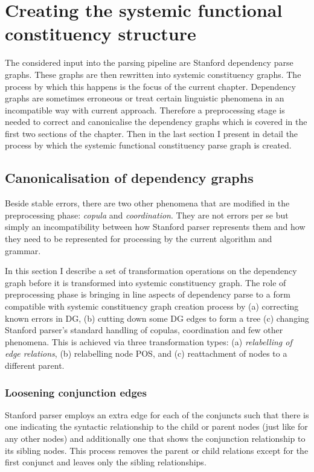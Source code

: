 \chapter{Creating the systemic functional constituency structure}
\label{ch:parsing-algorithm}

The considered input into the parsing pipeline are Stanford dependency parse graphs. These graphs are then rewritten into systemic constituency graphs. The process by which this happens is the focus of the current chapter. Dependency graphs are sometimes erroneous or treat certain linguistic phenomena in an incompatible way with current approach. Therefore a preprocessing stage is needed to correct and canonicalise the dependency graphs which is covered in the first two sections of the chapter. Then in the last section I present in detail the process by which the systemic functional constituency parse graph is created. 

\section{Canonicalisation of dependency graphs}
\label{sec:preprocessing1}
Beside stable errors, there are two other phenomena that are modified in the preprocessing phase: \textit{copula} and \textit{coordination}. They are not errors per se but simply an incompatibility between how Stanford parser represents them and how they need to be represented for processing by the current algorithm and grammar.

In this section I describe a set of transformation operations on the dependency graph before it is transformed into systemic constituency graph. The role of preprocessing phase is bringing in line aspects of dependency parse to a form compatible with systemic constituency graph creation process by (a) correcting known errors in DG, (b) cutting down some DG edges to form a tree (c) changing Stanford parser's standard handling of copulas, coordination and few other phenomena. This is achieved via three transformation types: (a) \textit{relabelling of edge relations}, (b) relabelling node POS, and (c) reattachment of nodes to a different parent. 

\subsection{Loosening conjunction edges}
Stanford parser employs an extra edge for each of the conjuncts such that there is one indicating the syntactic relationship to the child or parent nodes (just like for any other nodes) and additionally one that shows the conjunction relationship to its sibling nodes. This process removes the parent or child relations except for the first conjunct and leaves only the sibling relationships. 

